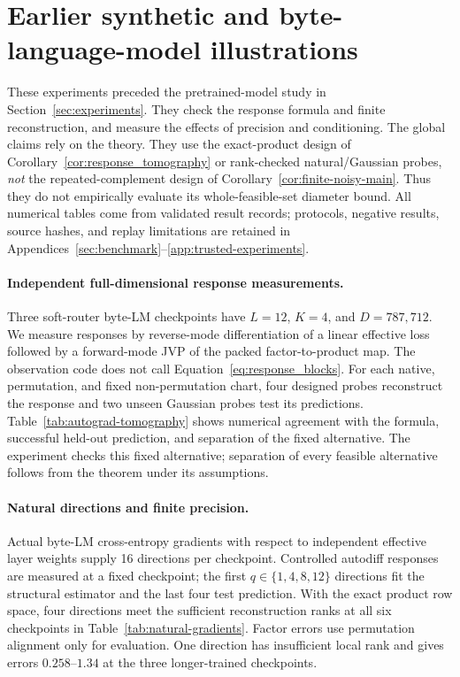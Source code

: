 \section{Earlier synthetic and byte-language-model illustrations}
\label{app:earlier-illustrations}

These experiments preceded the pretrained-model study in
Section~\ref{sec:experiments}. They check the response formula and finite
reconstruction, and measure the effects of precision and conditioning.
The global claims rely on the theory. They use the exact-product design of
Corollary~\ref{cor:response_tomography} or rank-checked natural/Gaussian
probes, \emph{not} the repeated-complement design of
Corollary~\ref{cor:finite-noisy-main}. Thus they do not empirically evaluate
its whole-feasible-set diameter bound. All numerical tables come from
validated result records; protocols, negative results, source hashes, and
replay limitations are retained in
Appendices~\ref{sec:benchmark}--\ref{app:trusted-experiments}.

\paragraph{Independent full-dimensional response measurements.}
Three soft-router byte-LM checkpoints have $L=12$, $K=4$, and $D=787{,}712$.
We measure responses by reverse-mode differentiation of a linear effective
loss followed by a forward-mode JVP of the packed factor-to-product map.
The observation code does not call Equation~\ref{eq:response_blocks}.
For each native, permutation, and fixed non-permutation chart, four designed
probes reconstruct the response and two unseen Gaussian probes test its
predictions. Table~\ref{tab:autograd-tomography} shows numerical agreement
with the formula, successful held-out prediction, and separation of the
fixed alternative. The experiment checks this fixed alternative; separation of every feasible
alternative follows from the theorem under its assumptions.



\paragraph{Natural directions and finite precision.}
Actual byte-LM cross-entropy gradients with respect to independent effective
layer weights supply 16 directions per checkpoint. Controlled autodiff
responses are measured at a fixed checkpoint; the first $q\in\{1,4,8,12\}$
directions fit the structural estimator and the last four test prediction.
With the exact product row space, four directions meet the sufficient
reconstruction ranks at all six checkpoints in
Table~\ref{tab:natural-gradients}. Factor errors use permutation alignment
only for evaluation. One direction has insufficient local rank and gives
errors $0.258$--$1.34$ at the three longer-trained checkpoints.


